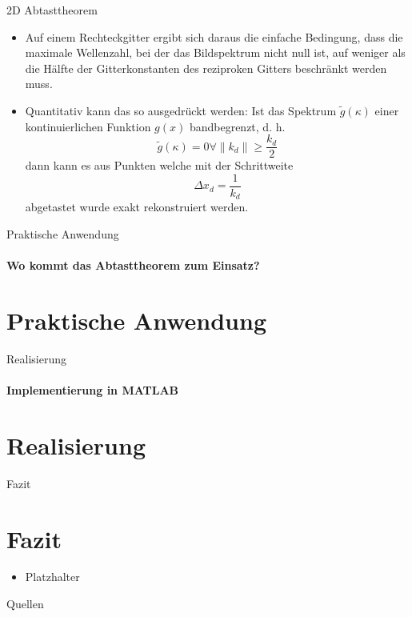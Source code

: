 \documentclass{beamer}
\begin{document}
	\begin{frame}{2D Abtasttheorem}
	\begin{itemize}
		\item Auf einem Rechteckgitter ergibt sich daraus die einfache Bedingung,	dass die maximale Wellenzahl, bei der das Bildspektrum nicht null ist,
		auf weniger als die Hälfte der Gitterkonstanten des reziproken Gitters beschränkt werden muss.
		\item Quantitativ kann das so ausgedrückt werden: Ist das Spektrum $\tilde{g}(\kappa)$ einer kontinuierlichen Funktion $g(x)$ bandbegrenzt, d. h.
		$$
		\tilde{g}(\kappa) = 0 \forall \left\|k_d\right\|\ge \frac{k_d}{2}
		$$
		dann kann es aus Punkten welche mit der Schrittweite
		$$
		\Delta x_d = \frac{1}{k_d}
		$$
		abgetastet wurde exakt rekonstruiert werden.
	\end{itemize}
	\end{frame}


	\begin{frame}{Praktische Anwendung}
	\framesubtitle{Wo kommt das Abtasttheorem zum Einsatz?}
	\section{Praktische Anwendung}
	\end{frame}
	
	\begin{frame}{Realisierung}
	\framesubtitle{Implementierung in MATLAB}
	\section{Realisierung}	
	\end{frame}

	\begin{frame}{Fazit}
	\section{Fazit}
	\begin{itemize}
		\item Platzhalter
	\end{itemize}
	\end{frame}
	
	\begin{frame}{Quellen}
		\begin{multicols}{2}
		\tiny{
			
			
		}
		\end{multicols}
	\end{frame}
	
\end{document}

